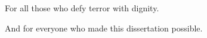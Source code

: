\begin{titlepage}

\vspace*{4cm}

\begin{center}
\large{
For all those who defy terror with dignity.

\vspace{2cm}

And for everyone who made this dissertation possible.}
\end{center}

\end{titlepage}